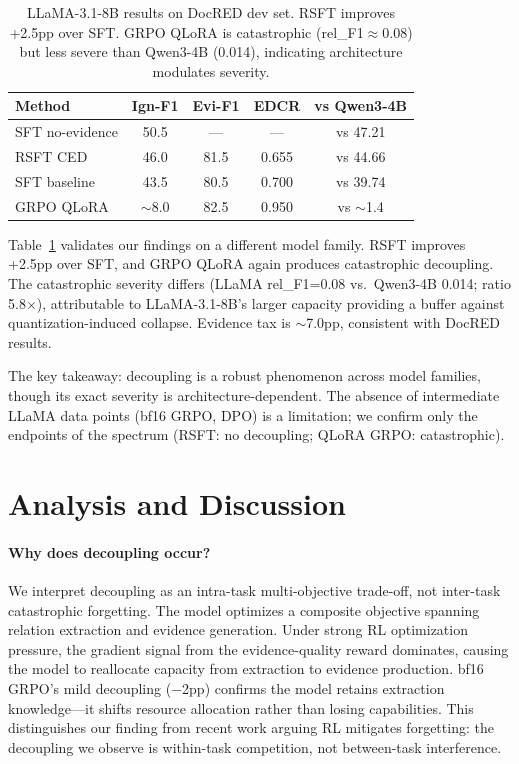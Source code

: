 \documentclass[11pt,a4paper]{article}
\begin{document}
\begin{table}[t]
\centering
\small
\begin{tabular}{lcccc}
\toprule
\textbf{Method} & \textbf{Ign-F1} & \textbf{Evi-F1} & \textbf{EDCR} & \textbf{vs Qwen3-4B} \\
\midrule
SFT no-evidence & 50.5 & --- & --- & vs 47.21 \\
RSFT CED & 46.0 & 81.5 & 0.655 & vs 44.66 \\
SFT baseline & 43.5 & 80.5 & 0.700 & vs 39.74 \\
GRPO QLoRA & $\sim$8.0 & 82.5 & 0.950 & vs $\sim$1.4 \\
\bottomrule
\end{tabular}
\caption{LLaMA-3.1-8B results on DocRED dev set. RSFT improves +2.5pp over SFT. GRPO QLoRA is catastrophic (rel\_F1$\approx$0.08) but less severe than Qwen3-4B (0.014), indicating architecture modulates severity.}
\label{tab:llama}
\end{table}

Table~\ref{tab:llama} validates our findings on a different model family. RSFT improves +2.5pp over SFT, and GRPO QLoRA again produces catastrophic decoupling. The catastrophic severity differs (LLaMA rel\_F1=0.08 vs.\ Qwen3-4B 0.014; ratio 5.8$\times$), attributable to LLaMA-3.1-8B's larger capacity providing a buffer against quantization-induced collapse. Evidence tax is $\sim$7.0pp, consistent with DocRED results.

The key takeaway: decoupling is a robust phenomenon across model families, though its exact severity is architecture-dependent. The absence of intermediate LLaMA data points (bf16 GRPO, DPO) is a limitation; we confirm only the endpoints of the spectrum (RSFT: no decoupling; QLoRA GRPO: catastrophic).

\section{Analysis and Discussion}
\label{sec:discussion}

\paragraph{Why does decoupling occur?} We interpret decoupling as an intra-task multi-objective trade-off, not inter-task catastrophic forgetting. The model optimizes a composite objective spanning relation extraction and evidence generation. Under strong RL optimization pressure, the gradient signal from the evidence-quality reward dominates, causing the model to reallocate capacity from extraction to evidence production. bf16 GRPO's mild decoupling ($-$2pp) confirms the model retains extraction knowledge---it shifts resource allocation rather than losing capabilities. This distinguishes our finding from recent work arguing RL mitigates forgetting: the decoupling we observe is within-task competition, not between-task interference.
\end{document}
